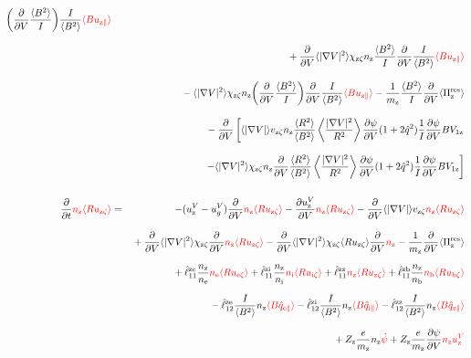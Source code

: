 \documentclass[11pt]{article}
\def\r#1{{\rm#1}}
\def\ave#1{\left\langle#1\right\rangle}
\def\aves#1{\langle#1\rangle}
\def\dd#1#2{\frac{\partial #1}{\partial #2}}
\def\para{\parallel}
\def\ddV{\frac{\partial}{\partial V}}
\def\ddt{\frac{\partial}{\partial t}}
\def\mz{m_\r{z}}
\def\nee{n_\r{e}}
\def\ni{n_\r{i}}
\def\nz{n_\r{z}}
\def\nb{n_\r{b}}
\def\Zz{Z_\r{z}}
\def\uzt#1{u_{\r{#1}\zeta}}
\def\upara#1{u_{\r{#1}\para}}
\def\qhatpara#1{\hat{q}_{\r{#1}\para}}
\def\uV#1{u_\r{#1}^V}
\def\ugV{u_{g}^V}
\def\chis#1{\chi_\r{#1}}
\def\red#1{\textcolor{red}{#1}}
\begin{document}
\begin{eqnarray}
  \biggl(\ddV \frac{\aves{B^2}}{I} \biggl) \frac{I}{\aves{B^2}} \red{\aves{B \upara{z}}}
\nonumber\\[3mm]&&{}
%
  + \ddV \aves{|\nabla V|^2} \chis{z\zeta} \nz
  \frac{\aves{B^2}}{I} \ddV \frac{I}{\aves{B^2}} \red{\aves{B \upara{z}}}
\nonumber\\[3mm]&&{}
%
  - \aves{|\nabla V|^2} \chis{z\zeta} \nz \biggl( \ddV
  \frac{\aves{B^2}}{I} \biggr) \ddV \frac{I}{\aves{B^2}} \red{\aves{B \upara{z}}}
%
  - \frac{1}{\mz} \frac{\aves{B^2}}{I} \ddV \aves{\Pi_\r{z}^\r{res}}
\nonumber\\[3mm]&&{}
%
  - \ddV
    \left[  \aves{|\nabla V|} v_{\r{z}\zeta} \nz
            \frac{\aves{R^2}}{\aves{B^2}}\ave{\frac{|\nabla V|^2}{R^2}}\dd{\psi}{V}(1+2\hat{q}^2)
	    \frac{1}{I} \dd{\psi}{V} BV_{1\r{z}} \right.
\nonumber\\[3mm]&&{}
    \left.- \aves{|\nabla V|^2} \chis{z\zeta} \nz
          \ddV \frac{\aves{R^2}}{\aves{B^2}}\ave{\frac{|\nabla V|^2}{R^2}}\dd{\psi}{V}(1+2\hat{q}^2)
	  \frac{1}{I} \dd{\psi}{V} BV_{1\r{z}}\right]
\\[5mm]
  \ddt \red{\nz \aves{R \uzt{z}}} &=&
%
  - (\uV{z} - \ugV) \ddV \red{\nz \aves{R \uzt{z}}}
%
  - \dd{\uV{z}}{V} \red{\nz \aves{R \uzt{z}}}
%
  - \ddV \aves{|\nabla V|} v_{\r{z}\zeta} \red{\nz \aves{R \uzt{z}}}
\nonumber\\[3mm]&&{}
  + \ddV \aves{|\nabla V|^2} \chis{z\zeta} \ddV \red{\nz \aves{R \uzt{z}}}
  - \ddV \aves{|\nabla V|^2} \chis{z\zeta} \aves{R \uzt{z}}\ddV \red{\nz} 
  - \frac{1}{\mz} \ddV \aves{\Pi_\r{z}^\r{res}}
\nonumber\\[2.5mm]&&{}
%
  + \hat{\ell}_{11}^\r{ze} \frac{\nz}{\nee} \red{\nee \aves{R \uzt{e}}}
  + \hat{\ell}_{11}^\r{zi} \frac{\nz}{\ni}  \red{\ni  \aves{R \uzt{i}}}
  + \hat{\ell}_{11}^\r{zz}                  \red{\nz  \aves{R \uzt{z}}}
  + \hat{\ell}_{11}^\r{zb} \frac{\nz}{\nb}  \red{\nb  \aves{R \uzt{b}}}
\nonumber\\[2.5mm]&&{}
%
  - \hat{\ell}_{12}^\r{ze} \frac{I}{\aves{B^2}} \nz \red{\aves{B \qhatpara{e}}}
  - \hat{\ell}_{12}^\r{zi} \frac{I}{\aves{B^2}} \nz \red{\aves{B \qhatpara{i}}}
  - \hat{\ell}_{12}^\r{zz} \frac{I}{\aves{B^2}} \nz \red{\aves{B \qhatpara{z}}}
\nonumber\\[2.5mm]&&{}
%
  + \Zz \frac{e}{\mz}              \nz \red{\dot{\psi}}
%
  + \Zz \frac{e}{\mz} \dd{\psi}{V} \red{\nz \uV{z}}
%
\nonumber\\[2.5mm]&&{}

\end{eqnarray}
\end{document}
